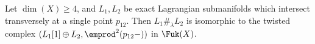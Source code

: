 %

\begin{corollary}
    Let $\dim(X)\geq 4$, and $L_1, L_2$ be exact Lagrangian submanifolds which intersect transversely at a single point $p_{12}$. Then $L_1\#_{\lambda} L_2$ is isomorphic to the twisted complex $(L_1[1]\oplus L_2, \emprod^2(p_{12}-))$ in $\Fuk(X)$.
\end{corollary}